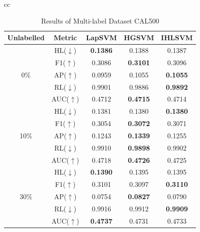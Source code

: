 \documentclass[12pt,a4paper,oneside,english]{report}
\begin{document}
\begin{table}[htbp]
    \caption{Results of Multi-label Datasets CAL500 and Enron}
    \tiny
    \centering
    \begin{tabular}{cc}
        \begin{minipage}{0.5\textwidth}
            \centering
            \caption*{Results of Multi-label Dataset CAL500}
            \begin{tabular}{|c|c|c|c|c|}
                \hline
                \textbf{Unlabelled} & \textbf{Metric} & \textbf{LapSVM} & \textbf{HGSVM} & \textbf{IHLSVM} \\
                \hline
                & HL(\(\downarrow\)) & \textbf{0.1386} & 0.1388 & 0.1387 \\
                & F1(\(\uparrow\)) & 0.3086 & \textbf{0.3101} & 0.3096 \\
                0\(\%\) & AP(\(\uparrow\)) & 0.0959 & 0.1055 & \textbf{0.1055} \\
                & RL(\(\downarrow\)) & 0.9901 & 0.9886 & \textbf{0.9892} \\
                & AUC(\(\uparrow\)) & 0.4712 & \textbf{0.4715} & 0.4714 \\
                \hline
                
                & HL(\(\downarrow\)) & 0.1381 & 0.1380 & \textbf{0.1380} \\
                & F1(\(\uparrow\)) & 0.3054 & \textbf{0.3072} & 0.3071 \\
                10\(\%\) & AP(\(\uparrow\)) & 0.1243 & \textbf{0.1339} & 0.1255 \\
                & RL(\(\downarrow\)) & 0.9910 & \textbf{0.9898} & 0.9902 \\
                & AUC(\(\uparrow\)) & 0.4718 & \textbf{0.4726} & 0.4725 \\
                \hline
                
                & HL(\(\downarrow\)) & \textbf{0.1390} & 0.1395 & 0.1395 \\
                & F1(\(\uparrow\)) & 0.3101 & 0.3097 & \textbf{0.3110} \\
                30\(\%\) & AP(\(\uparrow\)) & 0.0754 & \textbf{0.0827} & 0.0790 \\
                & RL(\(\downarrow\)) & 0.9916 & 0.9912 & \textbf{0.9909} \\
                & AUC(\(\uparrow\)) & \textbf{0.4737} & 0.4731 & 0.4733 \\
                \hline
                

\end{tabular}
\end{minipage}
\end{tabular}
\end{table}
\end{document}
